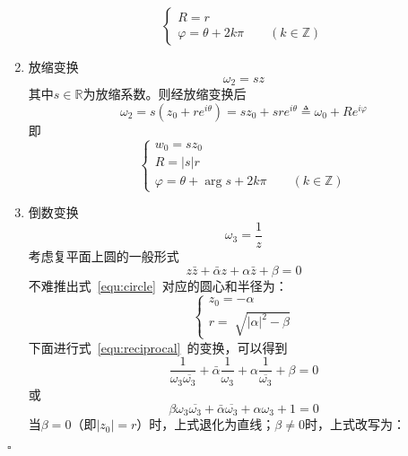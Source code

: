 \documentclass{article}
\newenvironment{SOLUTION}[1][{}]{{\noindent\heiti 解#1：}}{\hfill $\square$\par}
\begin{document}
\begin{SOLUTION}
\begin{enumerate}
\begin{equation}
\begin{cases}
    R = r\\
    \varphi  = \theta+2k\pi\qquad(k\in\mathbb{Z})
    \end{cases}
    \label{equ:move}
    \end{equation}
    \item 放缩变换
    \begin{equation}
    \omega_2 = sz
    \end{equation}
    其中$s\in \mathbb{R}$为放缩系数。则经放缩变换后
    \begin{equation}
    \omega_2 = s(z_0+re^{i\theta})=sz_0+sre^{i\theta}\triangleq \omega_0+Re^{i\varphi}
    \end{equation}
    即
    \begin{equation}
    \begin{cases}
    w_0=sz_0\\
    R=|s|r\\
    \varphi = \theta+\arg s +2k\pi\qquad(k\in\mathbb{Z})
    \end{cases}
    \label{equ:scale}
    \end{equation}
    \item 倒数变换
    \begin{equation}
    \omega_3 = \frac{1}{z}
    \label{equ:reciprocal}
    \end{equation}
    考虑复平面上圆的一般形式
    \begin{equation}
    z\bar{z}+\bar{\alpha}z+\alpha \bar{z}+\beta=0
    \label{equ:circle}
    \end{equation}
    不难推出式~\eqref{equ:circle}~对应的圆心和半径为：
    \begin{equation}
    \begin{cases}
    z_0=-\alpha\\
    r=\sqrt[]{|\alpha|^2-\beta}
    \end{cases}
    \end{equation}
    下面进行式~\eqref{equ:reciprocal}~的变换，可以得到
    \begin{equation*}
    \frac{1}{\omega_3\overline{\omega_3}}+\bar{\alpha}\frac{1}{\omega_3}+\alpha\frac{1}{\overline{\omega_3}}+\beta=0
    \end{equation*}
    或
    \begin{equation}
    \beta\omega_3\overline{\omega_3}+\bar{\alpha}\overline{\omega_3}+\alpha\omega_3+1=0
    \end{equation}
    当$\beta=0$（即$|z_0|=r$）时，上式退化为直线；$\beta\neq 0$时，上式改写为：
    \begin{equation}

\end{equation}
\end{enumerate}
\end{SOLUTION}
\end{document}
